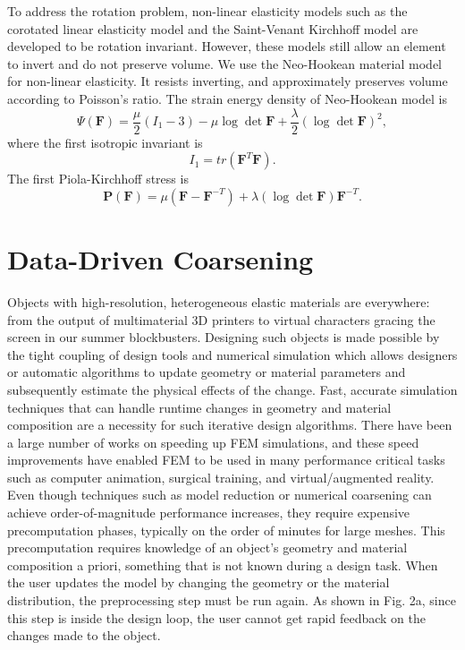 To address the rotation problem, non-linear elasticity models such as the corotated linear elasticity model and the Saint-Venant Kirchhoff model are developed to be rotation invariant.
However, these models still allow an element to invert and do not preserve volume.
We use the Neo-Hookean material model for non-linear elasticity. It resists inverting, and approximately preserves volume according to Poisson's ratio.
The strain energy density of Neo-Hookean model is
\[
\Psi(\mathbf{F})=\frac{\mu}{2}(I_1-3) - \mu \log \det \mathbf{F} 
+ \frac{\lambda}{2}(\log \det \mathbf{F})^2,
\]
where the first isotropic invariant is 
\[
I_1=tr(\mathbf{F}^T\mathbf{F}).
\]
The first Piola-Kirchhoff stress is
\[
\mathbf{P}(\mathbf{F})=\mu(\mathbf{F}-\mathbf{F}^{-T})+\lambda(\log\det\mathbf{F})\mathbf{F}^{-T}.
\]
\section{Data-Driven Coarsening}
Objects with high-resolution, heterogeneous elastic materials are everywhere:
from the output of multimaterial 3D printers to virtual characters 
gracing the screen in our summer blockbusters.
Designing such objects is made possible by the tight coupling of design
tools and numerical simulation which allows designers or automatic
algorithms to update geometry or material parameters and subsequently
estimate the physical effects of the change.
Fast, accurate simulation techniques that can handle runtime changes in geometry
and material composition are a necessity for such iterative design algorithms.
There have been a large number of works on speeding up FEM simulations,
and these speed improvements have enabled FEM to be used in many performance critical tasks 
such as computer animation, surgical training, and virtual/augmented reality.
Even though techniques such as model reduction or numerical coarsening can
achieve order-of-magnitude performance increases,
they require expensive precomputation phases, typically on the order of minutes for large meshes.
This precomputation requires knowledge of an
object’s geometry and material composition a priori, something
that is not known during a design task.
When the user updates the model by changing the geometry or the material distribution,
the preprocessing step must be run again.
As shown in Fig. 2a, since this step is inside the design loop,
the user cannot get rapid feedback on the changes made to the object.

